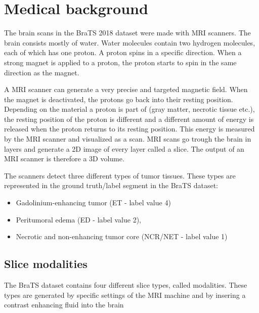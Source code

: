 \section{Medical background}
The brain scans in the BraTS\cite{menze2015multimodal} 2018 dataset were made with MRI scanners\cite{mriscanner}.
The brain consists mostly of water. Water molecules contain two hydrogen molecules, each of which has one proton. A proton spins in a specific direction. When a strong magnet is applied to a proton, the proton starts to spin in the same direction as the magnet. 

A MRI scanner can generate a very precise and targeted magnetic field. When the magnet is deactivated, the protons go back into their resting position. Depending on the material a proton is part of (gray matter, necrotic tissue etc.), the resting position of the proton is different and a different amount of energy is released when the proton returns to its resting position. This energy is measured by the MRI scanner and visualized as a scan. MRI scans go trough the brain in layers and generate a 2D image of every layer called a slice. The output of an MRI scanner is therefore a 3D volume.

The scanners detect three different types of tumor tissues. These types are represented in the ground truth/label segment in the BraTS dataset:

\begin{itemize}
    \item Gadolinium-enhancing tumor (ET - label value 4)
    \item Peritumoral edema (ED - label value 2),
    \item Necrotic and non-enhancing tumor core (NCR/NET - label value 1)
\end{itemize}




\subsection{Slice modalities}
The BraTS dataset contains four different slice types, called modalities. These types are generated by specific settings of the MRI machine and by insering a contrast enhancing fluid into the brain

